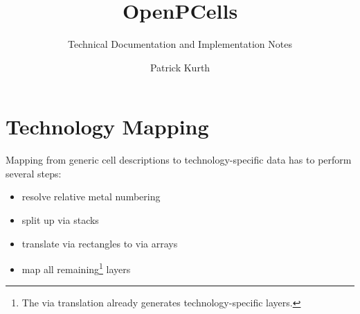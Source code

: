 

\title{OpenPCells}
\subtitle{Technical Documentation and Implementation Notes}
\author{Patrick Kurth}


\maketitle
\section{Technology Mapping}
Mapping from generic cell descriptions to technology-specific data has to perform several steps:
\begin{itemize}
    \item resolve relative metal numbering
    \item split up via stacks
    \item translate via rectangles to via arrays
    \item map all remaining\footnote{The via translation already generates technology-specific layers.} layers
\end{itemize}


